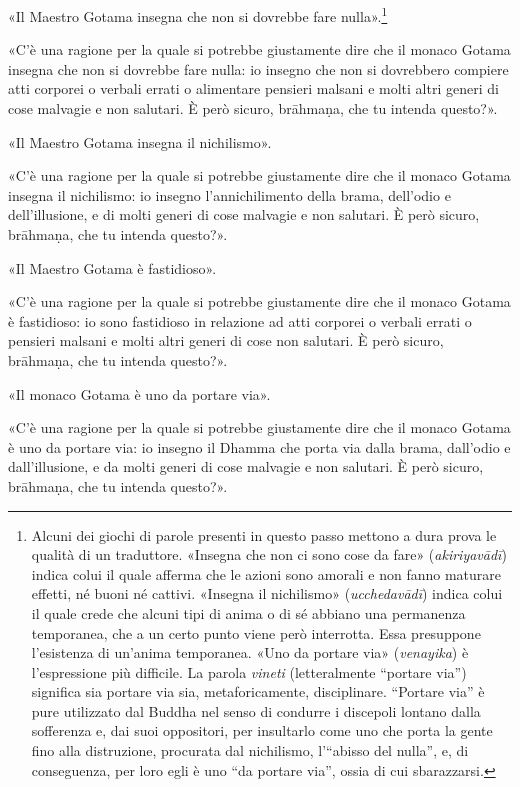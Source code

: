 «Il Maestro Gotama insegna che non si dovrebbe fare nulla».\footnote{Alcuni dei
  giochi di parole presenti in questo passo mettono a dura prova le qualità di
  un traduttore. «Insegna che non ci sono cose da fare» (\emph{akiriyavādī})
  indica colui il quale afferma che le azioni sono amorali e non fanno maturare
  effetti, né buoni né cattivi. «Insegna il nichilismo» (\emph{ucchedavādī})
  indica colui il quale crede che alcuni tipi di anima o di sé abbiano una
  permanenza temporanea, che a un certo punto viene però interrotta. Essa
  presuppone l’esistenza di un’anima temporanea. «Uno da portare via»
  (\emph{venayika}) è l’espressione più difficile. La parola \emph{vineti}
  (letteralmente “portare via”) significa sia portare via sia, metaforicamente,
  disciplinare. “Portare via” è pure utilizzato dal Buddha nel senso di condurre
  i discepoli lontano dalla sofferenza e, dai suoi oppositori, per insultarlo
  come uno che porta la gente fino alla distruzione, procurata dal nichilismo,
  l’“abisso del nulla”, e, di conseguenza, per loro egli è uno “da portare via”,
  ossia di cui sbarazzarsi.}

«C’è una ragione per la quale si potrebbe giustamente dire che il monaco Gotama
insegna che non si dovrebbe fare nulla: io insegno che non si dovrebbero
compiere atti corporei o verbali errati o alimentare pensieri malsani e molti
altri generi di cose malvagie e non salutari. È però sicuro, brāhmaṇa, che tu
intenda questo?».

«Il Maestro Gotama insegna il nichilismo».

«C’è una ragione per la quale si potrebbe giustamente dire che il monaco Gotama
insegna il nichilismo: io insegno l’annichilimento della brama, dell’odio e
dell’illusione, e di molti generi di cose malvagie e non salutari. È però
sicuro, brāhmaṇa, che tu intenda questo?».

«Il Maestro Gotama è fastidioso».

«C’è una ragione per la quale si potrebbe giustamente dire che il monaco Gotama
è fastidioso: io sono fastidioso in relazione ad atti corporei o verbali errati
o pensieri malsani e molti altri generi di cose non salutari. È però sicuro,
brāhmaṇa, che tu intenda questo?».

«Il monaco Gotama è uno da portare via».

«C’è una ragione per la quale si potrebbe giustamente dire che il monaco Gotama
è uno da portare via: io insegno il Dhamma che porta via dalla brama, dall’odio
e dall’illusione, e da molti generi di cose malvagie e non salutari. È però
sicuro, brāhmaṇa, che tu intenda questo?».

